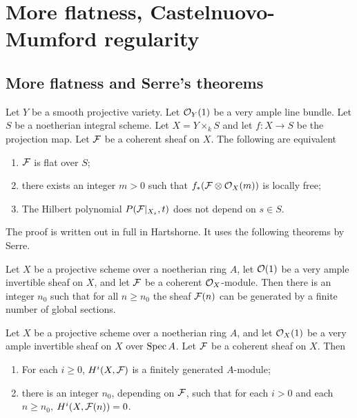 \chapter{More flatness, Castelnuovo-Mumford regularity}
\section{More flatness and Serre's theorems}
\begin{theorem}
	Let $Y$ be a smooth projective variety. Let $\mathcal{O}_Y(1)$ be a very ample line bundle. Let $S$ be a noetherian integral scheme. Let $X = Y\times_k S$ and let $f: X \to S$ be the projection map. Let $\mathcal{F}$ be a coherent sheaf on $X$. The following are equivalent 
	\begin{enumerate}[label=(\roman*)]
    	\item $\mathcal{F}$ is flat over $S$; 
		\item there exists an integer $m > 0$ such that $f_*(\mathcal{F}\otimes \mathcal{O}_X(m))$ is locally free;
		\item The Hilbert polynomial $P(\mathcal{F}|_{X_s}, t)$ does not depend on $s \in S$. 
    \end{enumerate}
\end{theorem}
The proof is written out in full in Hartshorne. It uses the following theorems by Serre. 
\begin{theorem}
	Let $X$ be a projective scheme over a noetherian ring $A$, let $\mathcal{O}(1)$ be a very ample invertible sheaf on $X$, and let $\mathcal{F}$ be a coherent $\mathcal{O}_X$-module. Then there is an integer $n_0$ such that for all $n \geq n_0$ the sheaf $\mathcal{F}(n)$ can be generated by a finite number of global sections.
\end{theorem}
\begin{theorem}
	Let $X$ be a projective scheme over a noetherian ring $A$, and let $\mathcal{O}_X(1)$ be a very ample invertible sheaf on $X$ over $\operatorname{Spec} A$. Let $\mathcal{F}$ be a coherent sheaf on $X$. Then \begin{enumerate}[label=(\alph*)]
    	\item For each $i \geq 0$, $H^i(X, \mathcal{F})$ is a finitely generated $A$-module;
		\item there is an integer $n_0$, depending on $\mathcal{F}$, such that for each $i > 0$ and each $n \geq n_0$, $H^i(X, \mathcal{F}(n)) = 0$.
    \end{enumerate}
\end{theorem}
